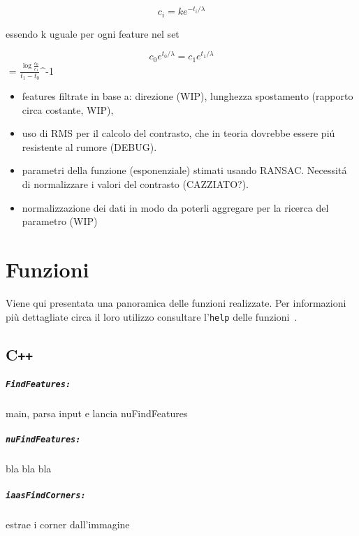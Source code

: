 \documentclass[12pt]{report}
\begin{document}
$$ c_i = ke^{-t_i/\lambda} $$

\noindent essendo k uguale per ogni feature nel set

$$ c_0e^{t_0/\lambda} = c_1e^{t_1/\lambda} $$
$$ \lambda = \(\frac{\log\frac{c_0}{c_1}}{t_1-t_0}\)^{-1}


\begin{itemize}
	\item features filtrate in base a: direzione (WIP), lunghezza spostamento (rapporto circa costante, WIP), 
	
	\item uso di RMS per il calcolo del contrasto, che in teoria dovrebbe essere pi\'u resistente al rumore (DEBUG).
	
	\item parametri della funzione (esponenziale) stimati usando RANSAC. Necessit\'a di normalizzare i valori del contrasto (CAZZIATO?).
	
	\item normalizzazione dei dati in modo da poterli aggregare per la ricerca del parametro (WIP)
\end{itemize}

\chapter{Funzioni}

Viene qui presentata una panoramica delle funzioni realizzate. Per informazioni pi\`u dettagliate circa il loro utilizzo consultare l'\verb|help| delle funzioni~\cite{lucaskanade81}.

\section[C++]{C\verb_++_}

\paragraph*{\verb_FindFeatures:_} main, parsa input e lancia nuFindFeatures

\paragraph*{\verb_nuFindFeatures:_} bla bla bla

\paragraph*{\verb_iaasFindCorners:_} estrae i corner dall'immagine
\end{document}
